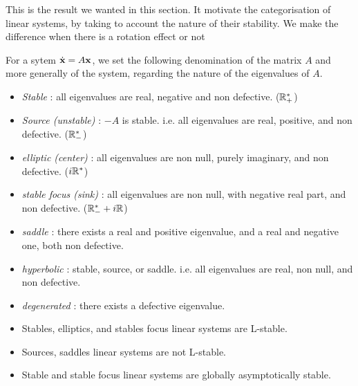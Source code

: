 This is the result we wanted in this section. It motivate the categorisation of linear systems, by taking to account the nature of their stability. We make the difference when there is a rotation effect or not
\begin{definition}
    For a sytem $\dot{\mathbf{x}}=A\mathbf{x}$, we set the following denomination of the matrix $A$ and more generally of the system, regarding the nature of the eigenvalues of $A$.
    \begin{itemize}
    \item \emph{Stable} : all eigenvalues are real, negative and non defective. ($\mathbb{R}^*_+$)
    \item \emph{Source (unstable)} : $-A$ is stable. i.e. all eigenvalues are real, positive, and non defective. ($\mathbb{R}^*_-$)
    \item \emph{elliptic (center)} : all eigenvalues are non null, purely imaginary, and non defective. ($i\mathbb{R}^*$)
    \item \emph{stable focus (sink)} : all eigenvalues are non null, with negative real part, and non defective. ($\mathbb{R}^*_-+i\mathbb{R}$)
    \item \emph{saddle} : there exists a real and positive eigenvalue, and a real and negative one, both non defective.
    \item \emph{hyperbolic} : stable, source, or saddle. i.e. all eigenvalues are real, non null, and non defective.
    \item \emph{degenerated} : there exists a defective eigenvalue.
    \end{itemize}
\end{definition}
\begin{corollaire}
\quad
\begin{itemize} 
    \item Stables, elliptics, and stables focus linear systems are L-stable.
    \item Sources, saddles linear systems are not L-stable.
    \item Stable and stable focus linear systems are globally asymptotically stable.
    \end{itemize} 
\end{corollaire}